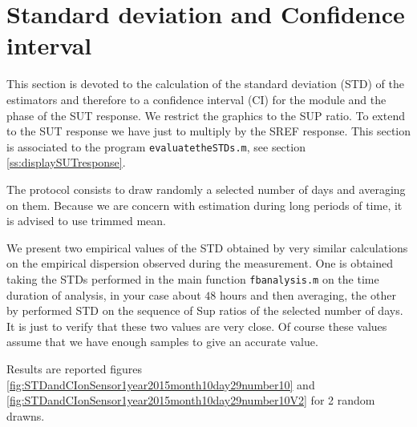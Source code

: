 \newpage\clearpage
\section{Standard deviation and Confidence interval}
This section is devoted to the calculation of the standard deviation (STD) of the estimators and therefore to a confidence interval (CI) for the module and the phase of the SUT response. We restrict the graphics to the SUP ratio. To extend to the SUT response we have just to multiply by the SREF response. This section is associated to the program {\tt evaluatetheSTDs.m}, see section
\ref{ss:displaySUTresponse}.

The protocol consists to draw randomly a selected number of days and averaging on them. Because we are concern with estimation during long periods of time, it is advised to use trimmed mean.

We present  two empirical values of the STD obtained by very similar calculations on the empirical dispersion observed during the measurement. One is obtained taking the STDs performed in the main function {\tt fbanalysis.m} on the time duration of analysis, in your case about $48$ hours and then averaging, the other by performed STD on the sequence of Sup ratios of the selected number of days. It is just to verify that these two values are very close. Of course these values assume that we have enough samples to give an accurate value. 

Results are reported figures \ref{fig:STDandCIonSensor1year2015month10day29number10} and \ref{fig:STDandCIonSensor1year2015month10day29number10V2} for 2 random drawns.



